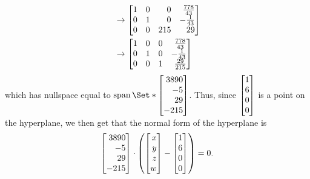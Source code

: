 \begin{exercises}
\begin{problist}
\begin{solution}
\begin{enumerate}
\begin{align*}
							&\rightarrow \mat{1&0&0&\frac{778}{43}\\0&1&0&-\frac{1}{43}\\0&0&215&29}\\
							&\rightarrow \mat{1&0&0&\frac{778}{43}\\0&1&0&-\frac{1}{43}\\0&0&1&\frac{29}{215}}
						\end{align*}
						which has nullspace equal to $\Span\Set*{\mat{3890\\-5\\29\\-215}}$. Thus, since $\mat{1\\6\\0\\0}$ is a point on the hyperplane, 
						we then get that the normal form of the hyperplane is \[\mat{3890\\-5\\29\\-215}\cdot\left(\mat{x\\y\\z\\w}-\mat{1\\6\\0\\0} \right)=0.\]
				\end{enumerate}
			\end{solution}	


\end{problist}
\end{exercises}
